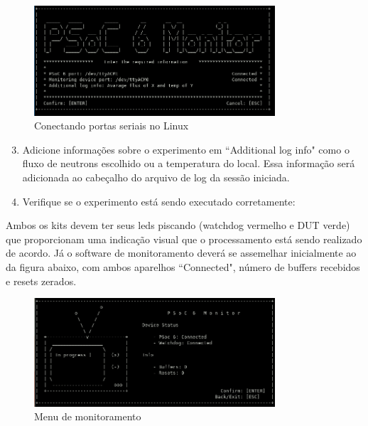 \documentclass[12pt, a4paper]{article}
\begin{document}
\begin{figure}[H]
    \centering
    \caption{Conectando portas seriais no Linux}
    \includegraphics[width=0.8\textwidth]{../imgs/serial_linux.png}

    \vspace{0.5em}
    \label{fig:serial_linux}
\end{figure}

\begin{enumerate}[leftmargin=1.3cm]
    \setcounter{enumi}{2}
    \item Adicione informações sobre o experimento em ``Additional log info" como o fluxo de neutrons escolhido ou a temperatura do local. Essa informação será adicionada ao cabeçalho do arquivo de log da sessão iniciada.

    \item Verifique se o experimento está sendo executado corretamente:
\end{enumerate}

Ambos os kits devem ter seus leds piscando (watchdog vermelho e DUT verde) que proporcionam uma indicação visual que o processamento está sendo realizado de acordo. Já o software de monitoramento deverá se assemelhar inicialmente ao da figura abaixo, com ambos aparelhos ``Connected", número de buffers recebidos e resets zerados. 

\begin{figure}[H]
    \centering
    \caption{Menu de monitoramento}
    \includegraphics[width=0.8\textwidth]{../imgs/monitoring.png}

    \vspace{0.5em}
    \label{fig:monitoring_menu}
\end{figure}
\end{document}
